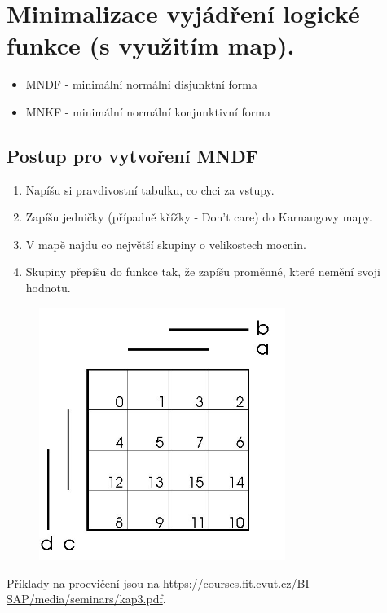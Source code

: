 \documentclass{szzclass}
\begin{document}
\section{Minimalizace vyjádření logické funkce (s využitím map).}
\begin{itemize}
  \item MNDF - minimální normální disjunktní forma
  \item MNKF - minimální normální konjunktivní forma
\end{itemize}

\subsection{Postup pro vytvoření MNDF}
\begin{enumerate}
  \item Napíšu si pravdivostní tabulku, co chci za vstupy.
  \item Zapíšu jedničky (případně křížky - Don't care) do Karnaugovy mapy.
  \item V mapě najdu co největší skupiny o velikostech mocnin.
  \item Skupiny přepíšu do funkce tak, že zapíšu proměnné, které nemění svoji hodnotu.
\end{enumerate}

\begin{figure}[h]
\includegraphics[width=8cm]{topics/bi-spol-27/karnaugh}
\end{figure}

Příklady na procvičení jsou na \url{https://courses.fit.cvut.cz/BI-SAP/media/seminars/kap3.pdf}.
\end{document}
